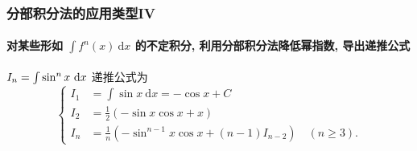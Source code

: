 \documentclass[
10pt,
aspectratio=43,
]{beamer}
\begin{document}
\begin{frame}
	\frametitle{分部积分法的应用类型IV}
	\framesubtitle{对某些形如 $\int f^n(x) \mathrm{~d} x$ 的不定积分, 利用分部积分法降低幂指数, 导出递推公式}
	\everymath{\displaystyle}
	{\small
		\begin{exampleblock}{$\color{black}I_n=\int \sin^n x\mathrm{~d} x$}
			递推公式为
			$$
				\left\{
				\begin{aligned}
					I_1 & =\int \sin x\mathrm{~d}x = -\cos x+C                                          \\
					I_2 & =\frac{1}{2}\left(-\sin x\cos x +x\right)                                     \\
					I_n & =\frac{1}{n}\left(-\sin^{n-1}x\cos x +(n-1)I_{n-2}\right)\,\,\,\,\,\,(n\ge3).
				\end{aligned}
				\right.
			$$
		\end{exampleblock}
	}
\end{frame}
\end{document}
